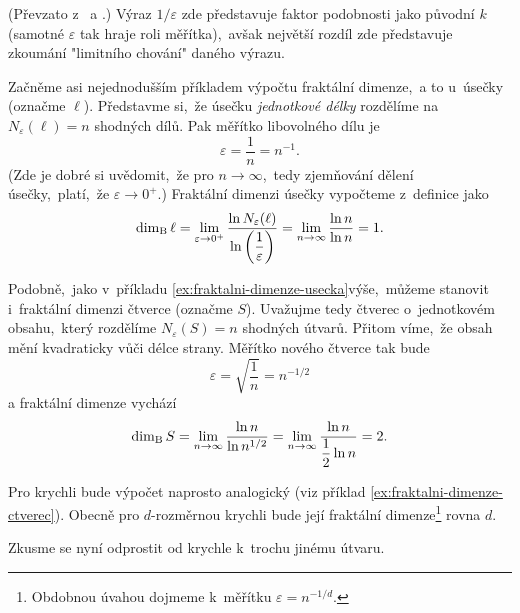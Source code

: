 (Převzato z~\cite[str. 93]{Zelinka2006} a \cite[str. 28]{Falconer2014}.) Výraz $1/\varepsilon$ zde představuje faktor podobnosti jako původní $k$ (samotné $\varepsilon$ tak hraje roli měřítka),~avšak největší rozdíl zde představuje zkoumání "limitního chování" daného výrazu.
\begin{example}\label{ex:fraktalni-dimenze-usecka}
    Začněme asi nejednodušším příkladem výpočtu fraktální dimenze,~a to u~úsečky (označme $\ell$). Představme si,~že úsečku \emph{jednotkové délky} rozdělíme na $N_\varepsilon(\ell)=n$ shodných dílů. Pak měřítko libovolného dílu je
    \[\varepsilon=\dfrac{1}{n}=n^{-1}.\]
    (Zde je dobré si uvědomit,~že pro $n\to\infty$,~tedy zjemňování dělení úsečky,~platí,~že $\varepsilon\to 0^+$.) Fraktální dimenzi úsečky vypočteme z~definice jako
    \[\operatorname{dim_B}{\ell}=\lim_{\varepsilon\to 0^+}{\dfrac{\ln{N_\varepsilon(\ell)}}{\ln{\left(\dfrac{1}{\varepsilon}\right)}}}=\lim_{n\to\infty}{\dfrac{\ln{n}}{\ln{n}}}=1.\]
\end{example}
\begin{example}\label{ex:fraktalni-dimenze-ctverec}
    Podobně,~jako v~příkladu \ref{ex:fraktalni-dimenze-usecka}\linebreak{}výše,~můžeme stanovit i~fraktální dimenzi čtverce (označme $S$). Uvažujme tedy čtverec o~jednotkovém obsahu,~který rozdělíme $N_\varepsilon(S)=n$ shodných útvarů. Přitom víme,~že obsah mění kvadraticky vůči délce strany. Měřítko nového čtverce tak bude
    \[\varepsilon=\sqrt{\dfrac{1}{n}}=n^{-1/2}\]
    a fraktální dimenze vychází
    \[\operatorname{dim_B}{S}=\lim_{n\to\infty}{\dfrac{\ln{n}}{\ln{n^{1/2}}}}=\lim_{n\to\infty}{\dfrac{\ln{n}}{\dfrac{1}{2}\ln{n}}}=2.\]
\end{example}
Pro krychli bude výpočet naprosto analogický (viz příklad \ref{ex:fraktalni-dimenze-ctverec}). Obecně pro $d$-rozměrnou krychli bude její fraktální dimenze\footnote{Obdobnou úvahou dojmeme k~měřítku $\varepsilon=n^{-1/d}$.} rovna $d$.\par
Zkusme se nyní odprostit od krychle k~trochu jinému útvaru.
